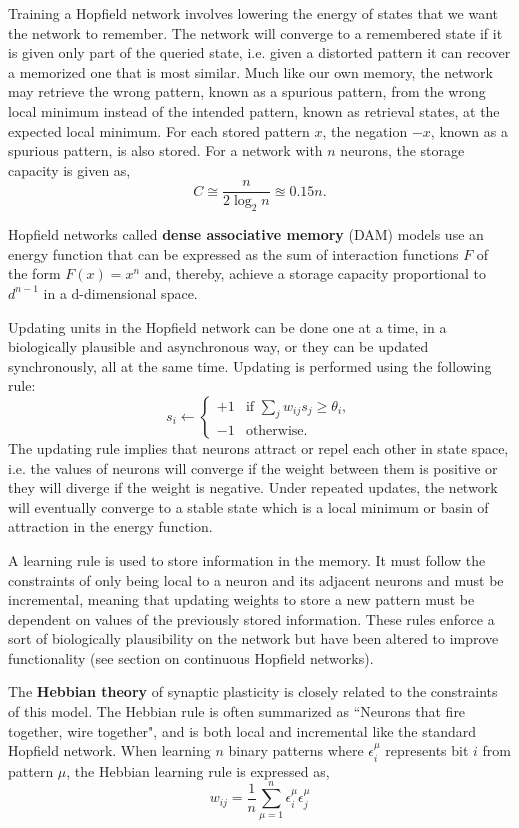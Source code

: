 \documentclass{article}
\begin{document}
Training a Hopfield network involves lowering the energy of states that we want the network to remember. The network will converge to a remembered state if it is given only part of the queried state, i.e. given a distorted pattern it can recover a memorized one that is most similar. Much like our own memory, the network may retrieve the wrong pattern, known as a spurious pattern, from the wrong local minimum instead of the intended pattern, known as retrieval states, at the expected local minimum. For each stored pattern $x$, the negation $-x$, known as a spurious pattern, is also stored. For a network with $n$ neurons, the storage capacity is given as, 
\[
    C\cong {\frac {n}{2\log _{2}n}} \approxeq 0.15n. 
\]

Hopfield networks called \textbf{dense associative memory} (DAM) models use an energy function that can be expressed as the sum of interaction functions $F$ of the form $F(x) = x^n$ and, thereby, achieve a storage capacity proportional to $d^{n-1}$ in a d-dimensional space.

Updating units in the Hopfield network can be done one at a time, in a biologically plausible and asynchronous way, or they can be updated synchronously, all at the same time. Updating is performed using the following rule:
\[
s_{i} \leftarrow \left\{
    {
    \begin{array}{ll}+1&{\mbox{if }} \displaystyle \sum _{{j}}{w_{{ij}}s_{j}}\geq \theta _{i},\\-1&{\mbox{otherwise.}}\end{array}
    }\right.
\]
The updating rule implies that neurons attract or repel each other in state space, i.e. the values of neurons will converge if the weight between them is positive or they will diverge if the weight is negative. Under repeated updates, the network will eventually converge to a stable state which is a local minimum or basin of attraction in the energy function. 

A learning rule is used to store information in the memory. It must follow the constraints of only being local to a neuron and its adjacent neurons and must be incremental, meaning that updating weights to store a new pattern must be dependent on values of the previously stored information. These rules enforce a sort of biologically plausibility on the network but have been altered to improve functionality (see section on continuous Hopfield networks).

The \textbf{Hebbian theory} of synaptic plasticity is closely related to the constraints of this model. The Hebbian rule is often summarized as ``Neurons that fire together, wire together", and is both local and incremental like the standard Hopfield network. When learning $n$ binary patterns where $\epsilon_{i}^{\mu }$ represents bit $i$ from pattern $\mu$, the Hebbian learning rule is expressed as,
\[
 w_{{ij}}={\frac  {1}{n}}\sum _{{\mu =1}}^{{n}}\epsilon _{{i}}^{\mu }\epsilon _{{j}}^{\mu }
\]
\end{document}
